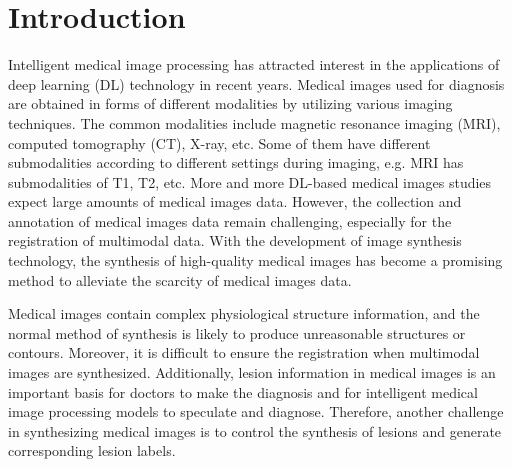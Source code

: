 \documentclass[runningheads]{llncs}
\begin{document}
	\section{Introduction}
	Intelligent medical image processing has attracted interest in the applications of deep learning (DL) technology in recent years. Medical images used for diagnosis are obtained in forms of different modalities by utilizing various imaging techniques. The common modalities include magnetic resonance imaging (MRI), computed tomography (CT), X-ray, etc. Some of them have different submodalities according to different settings during imaging, e.g. MRI has submodalities of T1, T2, etc. More and more DL-based medical images studies expect large amounts of medical images data. However, the collection and annotation of medical images data remain challenging, especially for the registration of multimodal data. With the development of image synthesis technology, the synthesis of high-quality medical images has become a promising method to alleviate the scarcity of medical images data.
	
	Medical images contain complex physiological structure information, and the normal method of synthesis is likely to produce unreasonable structures or contours. Moreover, it is difficult to ensure the registration when multimodal images are synthesized. Additionally, lesion information in medical images is an important basis for doctors to make the diagnosis and for intelligent medical image processing models to speculate and diagnose. Therefore, another challenge in synthesizing medical images is to control the synthesis of lesions and generate corresponding lesion labels.
	
\end{document}
